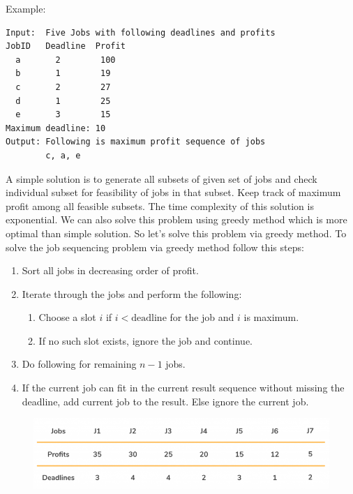 \documentclass[a4paper,11pt]{book}
\begin{document}
\vspace{5mm}

\noindent Example:
\begin{lstlisting}
Input:  Five Jobs with following deadlines and profits
JobID   Deadline  Profit
  a       2        100
  b       1        19
  c       2        27
  d       1        25
  e       3        15
Maximum deadline: 10
Output: Following is maximum profit sequence of jobs
        c, a, e
\end{lstlisting}

\noindent A simple solution is to generate all subsets of given set of jobs and check individual subset for feasibility of jobs in that subset. Keep track of maximum profit among all feasible subsets. The time complexity of this solution is exponential. We can also solve this problem using greedy method which is more optimal than simple solution. So let's solve this problem via greedy method. 
To solve the job sequencing problem via greedy method follow this steps:

\begin{enumerate}
    \item Sort all jobs in decreasing order of profit.
    \item Iterate through the jobs and perform the following:
    \begin{enumerate}
        \item Choose a slot $i$ if $i<\text{deadline}$ for the job and $i$ is maximum.
        \item If no such slot exists, ignore the job and continue.
    \end{enumerate}
    \item Do following for remaining $n-1$ jobs.
    \item If the current job can fit in the current result sequence without missing the deadline, add current job to the result. Else ignore the current job.
\end{enumerate}

\begin{figure}[ht]
	\centering
	\includegraphics[scale=0.35]{code/sort/pic/job1.png}
\end{figure}
\end{document}
